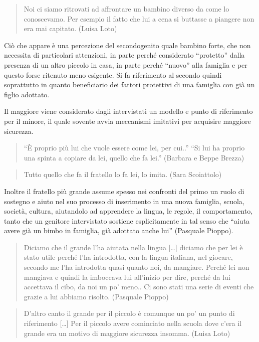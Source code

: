 \documentclass[12pt,oneside,svgnames]{memoir}
\newenvironment{quotationb}%
{\color{maincolor}\begin{leftbar}\begin{quotation}}%
{\end{quotation}\end{leftbar}\ignorespacesafterend}
\begin{document}
\begin{quotationb}
Noi ci siamo ritrovati ad affrontare un bambino diverso da come lo
conoscevamo. Per esempio il fatto che lui a cena si buttasse a piangere
non era mai capitato. (Luisa Loto)
\end{quotationb}

Ciò che appare è una percezione del secondogenito quale bambino forte,
che non necessita di particolari attenzioni, in parte perché considerato
``protetto'' dalla presenza di un altro piccolo in casa, in parte perché
``nuovo'' alla famiglia e per questo forse ritenuto meno esigente. Si fa
riferimento al secondo quindi soprattutto in quanto beneficiario dei
fattori protettivi di una famiglia con già un figlio adottato.

Il maggiore viene considerato dagli intervistati un modello e punto di
riferimento per il minore, il quale sovente avvia meccanismi imitativi
per acquisire maggiore sicurezza.

\begin{quotationb}
``È proprio più lui che vuole essere come lei, per cui..'' ``Si lui ha
proprio una spinta a copiare da lei, quello che fa lei.'' (Barbara e
Beppe Brezza)
\end{quotationb}

\begin{quotationb}
Tutto quello che fa il fratello lo fa lei, lo imita. (Sara Scoiattolo)
\end{quotationb}

Inoltre il fratello più grande assume spesso nei confronti del primo un
ruolo di sostegno e aiuto nel suo processo di inserimento in una nuova
famiglia, scuola, società, cultura, aiutandolo ad apprendere la lingua,
le regole, il comportamento, tanto che un genitore intervistato sostiene
esplicitamente in tal senso che ``aiuta avere già un bimbo in famiglia,
già adottato anche lui'' (Pasquale Pioppo).

\begin{quotationb}
Diciamo che il grande l'ha aiutata nella lingua {[}\ldots{}{]} diciamo
che per lei è stato utile perché l'ha introdotta, con la lingua
italiana, nel giocare, secondo me l'ha introdotta quasi quanto noi, da
mangiare. Perché lei non mangiava e quindi la imboccava lui all'inizio
per dire, perché da lui accettava il cibo, da noi un po' meno.. Ci sono
stati una serie di eventi che grazie a lui abbiamo risolto. (Pasquale
Pioppo)
\end{quotationb}

\begin{quotationb}
D'altro canto il grande per il piccolo è comunque un po' un punto di
riferimento {[}\ldots{}{]} Per il piccolo avere cominciato nella scuola
dove c'era il grande era un motivo di maggiore sicurezza insomma. (Luisa
Loto)
\end{quotationb}
\end{document}
